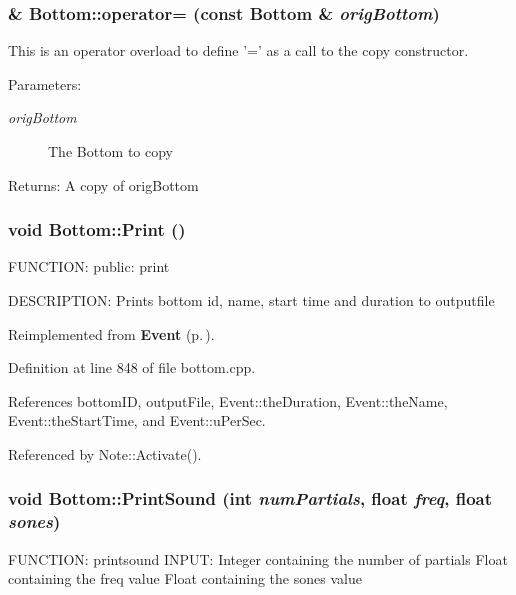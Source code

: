 \subsubsection{\& Bottom::operator= (const {\bf Bottom} \& {\em orig\-Bottom})}\label{classBottom_a4}


This is an operator overload to define '=' as a call to the copy constructor. \begin{Desc}
\item[Parameters:]
\begin{description}
\item[{\em orig\-Bottom}]The Bottom to copy \end{description}
\end{Desc}
\begin{Desc}
\item[Returns:]A copy of orig\-Bottom \end{Desc}
\subsubsection{\setlength{\rightskip}{0pt plus 5cm}void Bottom::Print ()\hspace{0.3cm}{\tt  [virtual]}}\label{classBottom_a30}


FUNCTION: public: print

DESCRIPTION: Prints bottom id, name, start time and duration to outputfile 

Reimplemented from {\bf Event} {\rm (p.\,\pageref{classEvent_a57})}.

Definition at line 848 of file bottom.cpp.

References bottom\-ID, output\-File, Event::the\-Duration, Event::the\-Name, Event::the\-Start\-Time, and Event::u\-Per\-Sec.

Referenced by Note::Activate().
\subsubsection{\setlength{\rightskip}{0pt plus 5cm}void Bottom::Print\-Sound (int {\em num\-Partials}, float {\em freq}, float {\em sones})}\label{classBottom_a31}


FUNCTION: printsound INPUT: Integer containing the number of partials Float containing the freq value Float containing the sones value

